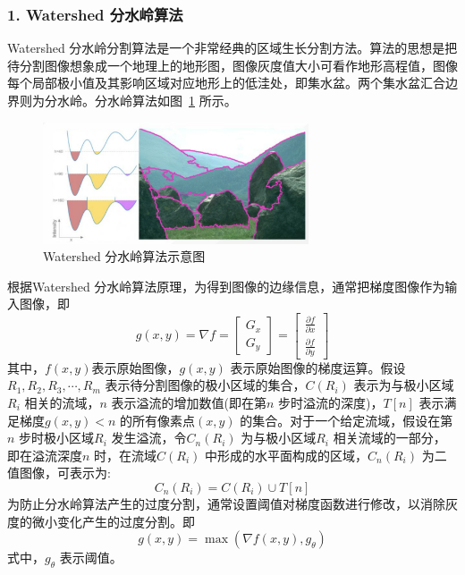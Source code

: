 \subsubsection*{1. Watershed 分水岭算法}
\label{subsubsec:chap02-1-1-1}
Watershed 分水岭分割算法是一个非常经典的区域生长分割方法。算法的思想是把待分割图像想象成一个地理上的地形图，图像灰度值大小可看作地形高程值，图像每个局部极小值及其影响区域对应地形上的低洼处，即集水盆。两个集水盆汇合边界则为分水岭。分水岭算法如图~\ref{fig:watershed} 所示。

\begin{figure}[htb]
  \centering
  \includegraphics[width=0.7\textwidth]{figures/watershed}
  \caption{Watershed 分水岭算法示意图 }\label{fig:watershed}
\end{figure}

根据Watershed 分水岭算法原理，为得到图像的边缘信息，通常把梯度图像作为输入图像，即
\begin{equation}
  \label{eq:2-1}
  g(x,y) = \nabla f = \left[
    \begin{matrix}
      G_x \\
      G_y
    \end{matrix}
    \right] =
  \left[
    \begin{matrix}
      \frac{\partial f}{\partial x} \\
      \frac{\partial f}{\partial y}
    \end{matrix}
    \right]
\end{equation}
其中，$f(x,y)$表示原始图像，$g(x,y)$ 表示原始图像的梯度运算。假设$R_1,R_2,R_3,\cdots,R_m$ 表示待分割图像的极小区域的集合，$C(R_i)$ 表示为与极小区域$R_i$ 相关的流域，$n$ 表示溢流的增加数值(即在第$n$ 步时溢流的深度)，$T[n]$ 表示满足梯度$g(x,y)<n$ 的所有像素点$(x,y)$ 的集合。对于一个给定流域，假设在第$n$ 步时极小区域$R_i$ 发生溢流，令$C_n(R_i)$ 为与极小区域$R_i$ 相关流域的一部分，即在溢流深度$n$ 时，在流域$C(R_i)$ 中形成的水平面构成的区域，$C_n(R_i)$ 为二值图像，可表示为:
\begin{equation}
  \label{eq:2-2}
  C_n(R_i) = C(R_i)\cup T[n]
\end{equation}
为防止分水岭算法产生的过度分割，通常设置阈值对梯度函数进行修改，以消除灰度的微小变化产生的过度分割。即
\begin{equation}
  \label{eq:2-3}
  g(x,y) = \max ( \nabla f(x,y),g_{\theta})
\end{equation}
式中，$g_{\theta}$ 表示阈值。

